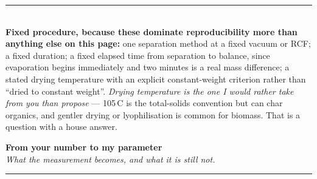 \documentclass[landscape,12pt]{article}
\newcommand{\pagehead}[2]{%
  {\Large\bfseries #1}\\[1pt]
  {\small\itshape #2}\\[-4pt]
  \rule{\linewidth}{0.6pt}\\[4pt]}
\begin{document}
\vspace{3mm}
\noindent\rule{\linewidth}{0.4pt}\\[2pt]
{\small\textbf{Fixed procedure, because these dominate reproducibility more than anything
else on this page:} one separation method at a fixed vacuum or RCF; a fixed duration; a fixed
elapsed time from separation to balance, since evaporation begins immediately and two minutes
is a real mass difference; a stated drying temperature with an explicit constant-weight
criterion rather than ``dried to constant weight''. \emph{Drying temperature is the one I would
rather take from you than propose} --- 105\,\textdegree C is the total-solids convention but
can char organics, and gentler drying or lyophilisation is common for biomass. That is a
question with a house answer.}

\newpage
\pagehead{From your number to my parameter}%
{What the measurement becomes, and what it is still not.}
\end{document}
